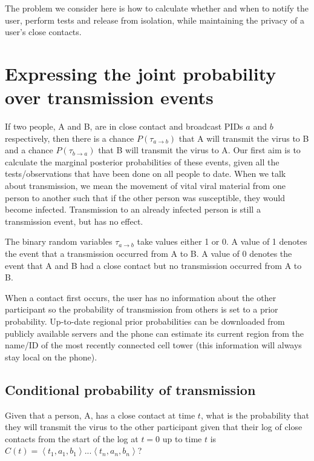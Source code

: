 \documentclass{article}
\begin{document}
The problem we consider here is how to calculate whether and when to notify the user, perform tests and release from isolation, while maintaining the privacy of a user's close contacts.


\section{Expressing the joint probability over transmission events}

If two people, A and B, are in close contact and broadcast PIDs $a$ and $b$ respectively, then there is a chance $P(\tau_{a \rightarrow b})$ that A will transmit the virus to B and a chance $P(\tau_{b \rightarrow a})$ that B will transmit the virus to A. Our first aim is to calculate the marginal posterior probabilities of these events, given all the tests/observations that have been done on all people to date. When we talk about transmission, we mean the movement of vital viral material from one person to another such that if the other person was susceptible, they would become infected. Transmission to an already infected person is still a transmission event, but has no effect.

The binary random variables $\tau_{a\rightarrow b}$ take values either 1 or 0. A value of 1 denotes the event that a transmission occurred from A to B. A value of 0 denotes the event that A and B had a close contact but no transmission occurred from A to B.

When a contact first occurs, the user has no information about the other participant so the probability of transmission from others is set to a prior probability. Up-to-date regional prior probabilities can be downloaded from publicly available servers and the phone can estimate its current region from the name/ID of the most recently connected cell tower (this information will always stay local on the phone).

\subsection{Conditional probability of transmission}

Given that a person, A, has a close contact at time $t$, what is the probability that they will transmit the virus to the other participant given that their log of close contacts from the start of the log at $t=0$ up to time $t$ is $C(t) = \left< t_{1},a_1,b_1 \right> ... \left< t_{n},a_n,b_n \right>$?
\end{document}
